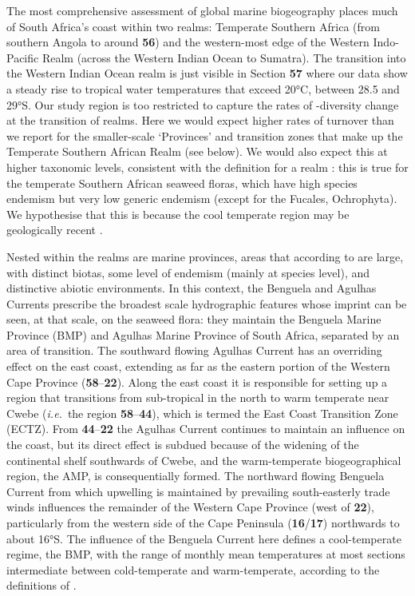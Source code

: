 \documentclass[utf8]{frontiersSCNS} %
\begin{document}
The most comprehensive assessment of global marine biogeography \citep{Spalding2007} places much of South Africa's coast within two realms: Temperate Southern Africa (from southern Angola to around \textbf{56}) and the western-most edge of the Western Indo-Pacific Realm (across the Western Indian Ocean to Sumatra). The transition into the Western Indian Ocean realm is just visible in Section \textbf{57} where our data show a steady rise to tropical water temperatures that exceed 20°C, between 28.5 and 29°S. Our study region is too restricted to capture the rates of \textbeta-diversity change at the transition of realms. Here we would expect higher rates of turnover than we report for the smaller-scale `Provinces' and transition zones that make up the Temperate Southern African Realm (see below). We would also expect this at higher taxonomic levels, consistent with the definition for a realm \citep{Spalding2007}: this is true for the temperate Southern African seaweed floras, which have high species endemism but very low generic endemism (except for the Fucales, Ochrophyta). We hypothesise that this is because the cool temperate region may be geologically recent \citep[4.6--3.2 Ma,][]{Marlow2000}.

Nested within the realms are marine provinces, areas that according to \citep{Spalding2007} are large, with distinct biotas, some level of endemism (mainly at species level), and distinctive abiotic environments. In this context, the Benguela and Agulhas Currents prescribe the broadest scale hydrographic features whose imprint can be seen, at that scale, on the seaweed flora: they maintain the Benguela Marine Province (BMP) and Agulhas Marine Province \citep[AMP, as per][]{Spalding2007} of South Africa, separated by an area of transition. The southward flowing Agulhas Current has an overriding effect on the east coast, extending as far as the eastern portion of the Western Cape Province (\textbf{58}--\textbf{22}). Along the east coast it is responsible for setting up a region that transitions from sub-tropical in the north to warm temperate near Cwebe (\emph{i.e.}~the region \textbf{58}--\textbf{44}), which is termed the East Coast Transition Zone (ECTZ). From \textbf{44}--\textbf{22} the Agulhas Current continues to maintain an influence on the coast, but its direct effect is subdued because of the widening of the continental shelf southwards of Cwebe, and the warm-temperate biogeographical region, the AMP, is consequentially formed. The northward flowing Benguela Current from which upwelling is maintained by prevailing south-easterly trade winds influences the remainder of the Western Cape Province (west of \textbf{22}), particularly from the western side of the Cape Peninsula (\textbf{16}/\textbf{17}) northwards to about 16°S. The influence of the Benguela Current here defines a cool-temperate regime, the BMP, with the range of monthly mean temperatures at most sections intermediate between cold-temperate and warm-temperate, according to the definitions of \citep{luning1990seaweeds}.
\end{document}
